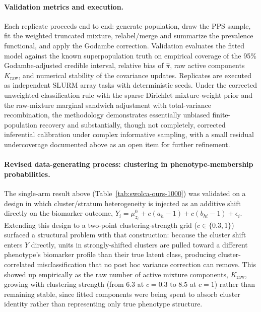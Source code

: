 \documentclass[11pt]{article}
\begin{document}
\paragraph{Validation metrics and execution.} Each replicate proceeds end to end: generate population, draw the PPS sample, fit the weighted truncated mixture, relabel/merge and summarize the prevalence functional, and apply the Godambe correction. Validation evaluates the fitted model against the known superpopulation truth on empirical coverage of the 95\% Godambe-adjusted credible interval, relative bias of $\hat\pi$, raw active components $K_{\text{raw}}$, and numerical stability of the covariance updates. Replicates are executed as independent SLURM array tasks with deterministic seeds. Under the corrected unweighted-classification rule with the sparse Dirichlet mixture-weight prior and the raw-mixture marginal sandwich adjustment with total-variance recombination, the methodology demonstrates essentially unbiased finite-population recovery and substantially, though not completely, corrected inferential calibration under complex informative sampling, with a small residual undercoverage documented above as an open item for further refinement.

\paragraph{Revised data-generating process: clustering in phenotype-membership probabilities.} The single-arm result above (Table~\ref{tab:swolca-ours-1000}) was validated on a design in which cluster/stratum heterogeneity is injected as an additive shift directly on the biomarker outcome, $Y_i = \mu^0_{z_i} + c(a_h-1) + c(b_{hi}-1) + \epsilon_i$. Extending this design to a two-point clustering-strength grid ($c \in \{0.3, 1\}$) surfaced a structural problem with that construction: because the cluster shift enters $Y$ directly, units in strongly-shifted clusters are pulled toward a different phenotype's biomarker profile than their true latent class, producing cluster-correlated misclassification that no post hoc variance correction can remove. This showed up empirically as the raw number of active mixture components, $K_{\text{raw}}$, growing with clustering strength (from $6.3$ at $c=0.3$ to $8.5$ at $c=1$) rather than remaining stable, since fitted components were being spent to absorb cluster identity rather than representing only true phenotype structure.
\end{document}
